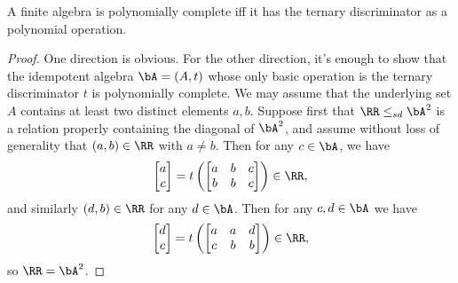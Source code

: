 \begin{prop} A finite algebra is polynomially complete iff it has the ternary discriminator as a polynomial operation.
\end{prop}
\begin{proof} One direction is obvious. For the other direction, it's enough to show that the idempotent algebra $\bA = (A,t)$ whose only basic operation is the ternary discriminator $t$ is polynomially complete. We may assume that the underlying set $A$ contains at least two distinct elements $a,b$. Suppose first that $\RR \le_{sd} \bA^2$ is a relation properly containing the diagonal of $\bA^2$, and assume without loss of generality that $(a,b) \in \RR$ with $a \ne b$. Then for any $c \in \bA$, we have
\[
\begin{bmatrix} a\\ c\end{bmatrix} = t\left(\begin{bmatrix} a & b & c\\ b & b & c \end{bmatrix}\right) \in \RR,
\]
and similarly $(d,b) \in \RR$ for any $d \in \bA$. Then for any $c,d \in \bA$ we have
\[
\begin{bmatrix} d\\ c\end{bmatrix} = t\left(\begin{bmatrix} a & a & d\\ c & b & b \end{bmatrix}\right) \in \RR,
\]
so $\RR = \bA^2$.


\end{proof}
